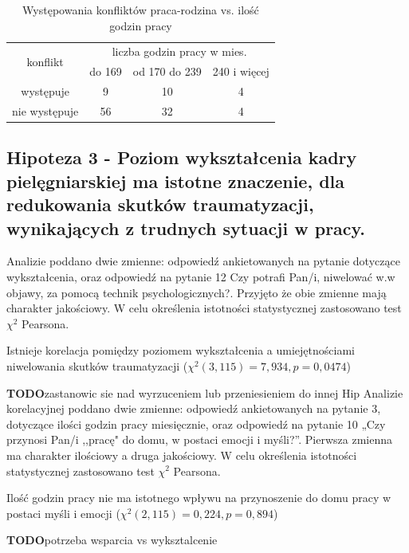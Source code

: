 \documentclass[a4paper,12pt,twoside,openany]{report}
\newcommand{\TODO}{\textbf{TODO}}
\begin{document}
\begin {table}[h]
\caption{Występowania konfliktów praca-rodzina vs. ilość godzin pracy}
\begin{tabular}{|c|c|c|c|}
\hline
\multirow{2}{1cm}{konflikt} & 
   \multicolumn{3}{|c|}{liczba godzin pracy w mies.}\\
   \cline{2-4}
    &  do 169 & od 170 do 239 & 240 i więcej \\
\hline
występuje & 9 & 10 & 4 \\
\hline
nie występuje & 56 & 32 & 4\\
\hline

\end{tabular}
\label{tab:konflikt-godziny}
\end{table}
  
\vspace{\baselineskip}   

\subsection*{Hipoteza 3 - Poziom wykształcenia kadry pielęgniarskiej ma istotne znaczenie, dla  redukowania skutków traumatyzacji, wynikających z trudnych sytuacji w pracy.}


Analizie poddano dwie zmienne: odpowiedź ankietowanych na pytanie dotyczące wykształcenia, oraz odpowiedź na pytanie 12 Czy potrafi Pan/i, niwelować w.w objawy, za pomocą technik psychologicznych?. Przyjęto że obie zmienne mają charakter jakościowy. W celu określenia istotności statystycznej zastosowano test $\chi^2$ Pearsona.

Istnieje korelacja pomiędzy poziomem wykształcenia a umiejętnościami niwelowania skutków traumatyzacji ($\chi^2 (3, 115) = 7,934, p=0,0474$)

\TODO zastanowic sie nad wyrzuceniem lub przeniesieniem do innej Hip
Analizie korelacyjnej poddano dwie zmienne: odpowiedź ankietowanych na pytanie 3, dotyczące ilości godzin pracy miesięcznie, oraz odpowiedź na pytanie 10 „Czy przynosi Pan/i ,,pracę" do domu, w postaci emocji i myśli?”. Pierwsza zmienna ma charakter ilościowy a druga jakościowy. W celu określenia istotności statystycznej zastosowano test $\chi^2$ Pearsona.

    Ilość godzin pracy nie ma istotnego wpływu na przynoszenie do domu pracy w postaci myśli i emocji ($\chi^2 (2, 115) = 0,224, p=0,894$)
    
    \TODO potrzeba wsparcia  vs wyksztalcenie
    
\end{document}
